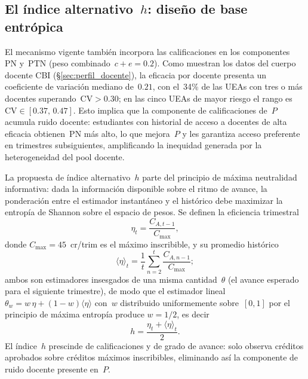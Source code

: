 \documentclass[11pt,letterpaper]{article}
\begin{document}
\subsection{El índice alternativo~\texorpdfstring{$h$}{h}: diseño de base entrópica}
\label{sec:indice_h}

El mecanismo vigente también incorpora las calificaciones en los
componentes~$\mathrm{PN}$ y~$\mathrm{PTN}$ (peso combinado~$c+e=0.2$).
Como muestran los datos del cuerpo docente CBI (\S\ref{sec:perfil_docente}),
la eficacia por docente presenta un coeficiente de variación mediano de~$0.21$,
con el~34\% de las UEAs con tres o más docentes superando~$\mathrm{CV}>0.30$;
en las cinco UEAs de mayor riesgo el rango es~$\mathrm{CV}\in[0.37,\,0.47]$.
Esto implica que la componente de calificaciones de~$P$ acumula ruido docente:
estudiantes con historial de acceso a docentes de alta eficacia obtienen~$\mathrm{PN}$
más alto, lo que mejora~$P$ y les garantiza acceso preferente en trimestres
subsiguientes, amplificando la inequidad generada por la heterogeneidad del pool
docente.

La propuesta de índice alternativo~$h$ \cite{prelacion_cslm} parte del
principio de máxima neutralidad informativa: dada la información disponible
sobre el ritmo de avance, la ponderación entre el estimador instantáneo y el
histórico debe maximizar la entropía de Shannon sobre el espacio de pesos.
Se definen la eficiencia trimestral
\begin{equation}
  \eta_t = \frac{C_{A,t-1}}{C_{\max}},
  \label{eq:eta}
\end{equation}
donde $C_{\max}=45$~cr/trim es el máximo inscribible, y su promedio histórico
\begin{equation}
  \langle\eta\rangle_t = \frac{1}{t}\sum_{n=2}^{t}\frac{C_{A,n-1}}{C_{\max}};
  \label{eq:eta_bar}
\end{equation}
ambos son estimadores insesgados de una misma cantidad~$\theta$ (el avance
esperado para el siguiente trimestre), de modo que el estimador lineal
$\theta_w = w\,\eta + (1-w)\langle\eta\rangle$ con~$w$ distribuido
uniformemente sobre~$[0,1]$ por el principio de máxima entropía produce
$w=1/2$, es decir
\begin{equation}
  h = \frac{\eta_t + \langle\eta\rangle_t}{2}.
  \label{eq:indice_h}
\end{equation}
El índice~$h$ prescinde de calificaciones y de grado de avance: solo observa
créditos aprobados sobre créditos máximos inscribibles, eliminando así la
componente de ruido docente presente en~$P$.
\end{document}
